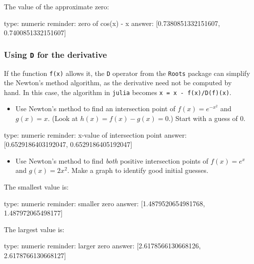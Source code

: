 \documentclass[12pt]{article}
\begin{document}
The value of the approximate zero:

\begin{answer}
    type: numeric
    reminder: zero of cos(x) - x
    answer: [0.7380851332151607, 0.7400851332151607]

\end{answer}

\subsubsection{Using \texttt{D} for the derivative}

If the function \texttt{f(x)} allows it, the \texttt{D} operator from
the \texttt{Roots} package can simplify the Newton's method algorithm,
as the derivative need not be computed by hand. In this case, the
algorithm in \texttt{julia} becomes \texttt{x = x - f(x)/D(f)(x)}.

\begin{itemize}
\itemsep1pt\parskip0pt
\item
  Use Newton's method to find an intersection point of
  $f(x) =   e^{-x^2}$ and $g(x)=x$. (Look at $h(x) = f(x) - g(x) = 0$.)
  Start with a guess of $0$.
\end{itemize}

\begin{answer}
    type: numeric
    reminder: x-value of intersection point
    answer: [0.6529186403192047, 0.6529186405192047]

\end{answer}

\begin{itemize}
\itemsep1pt\parskip0pt
\item
  Use Newton's method to find \emph{both} positive intersection points
  of $f(x) = e^x$ and $g(x) = 2x^2$. Make a graph to identify good
  initial guesses.
\end{itemize}

The smallest value is:

\begin{answer}
    type: numeric
    reminder: smaller zero
    answer: [1.4879520654981768, 1.487972065498177]

\end{answer}

The largest value is:

\begin{answer}
    type: numeric
    reminder: larger zero
    answer: [2.6178566130668126, 2.6178766130668127]

\end{answer}
\end{document}
